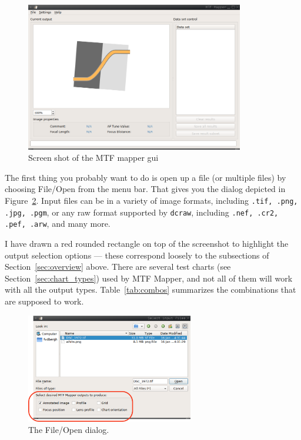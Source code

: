 \documentclass[a4paper]{article}
\begin{document}
\begin{figure}[hb!]
\centering
\includegraphics[width=0.85\textwidth]{figures/sshot1}
\caption{Screen shot of the MTF mapper gui}
\label{fig:sshot1}
\end{figure}


The first thing you probably want to do is open up a file (or multiple
files) by choosing \textsf{File/Open} from the menu bar. That gives you the
dialog depicted in Figure~\ref{fig:file_dialog}. Input files can be in a variety 
of image formats, including \texttt{.tif, .png, .jpg, .pgm}, 
or any raw format supported by \verb+dcraw+, including 
\texttt{.nef, .cr2, .pef, .arw}, and many more.

\newpage

I have drawn a red rounded rectangle on top of the screenshot to highlight
the output selection options --- these correspond loosely to the subsections
of Section~\ref{sec:overview} above.  There are several test charts (see
Section~\ref{sec:chart_types}) used by MTF Mapper, and not all of them will
work with all the output types.  Table~\ref{tab:combos} summarizes the
combinations that are supposed to work.

\begin{figure}[ht!]
\centering
\includegraphics[width=0.65\textwidth]{figures/file_dialog2}
\caption{The File/Open dialog.}
\label{fig:file_dialog}
\end{figure}
\end{document}
